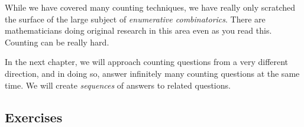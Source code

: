 \documentclass[10pt,]{book}
\theoremstyle{plain}
\theoremstyle{definition}
\theoremstyle{definition}
\theoremstyle{definition}
\numberwithin{equation}{chapter}
\begin{document}
      While we have covered many counting techniques, we have really only scratched the surface of the large subject of \emph{enumerative combinatorics}. There are mathematicians doing original research in this area even as you read this. Counting can be really hard.
\par

      In the next chapter, we will approach counting questions from a very different direction, and in doing so, answer infinitely many counting questions at the same time. We will create \emph{sequences} of answers to related questions.
\typeout{************************************************}
\typeout{************************************************}
\subsection[Exercises]{Exercises}\label{exercises-10}
\end{document}
